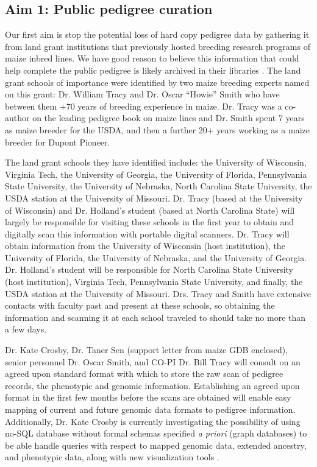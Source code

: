 \documentclass[draft,12pt]{article}
\begin{document}
\subsection*{Aim 1: Public pedigree curation}
Our first aim is  stop the potential loss of hard copy pedigree data by gathering it from land grant institutions that previously hosted breeding research programs of maize inbred lines. 
We have good reason to believe this information that could help complete the public pedigree is likely archived in their libraries . 
The land grant schools of importance were identified by two maize breeding experts named on this grant: Dr. William Tracy and Dr. Oscar ``Howie'' Smith who have between them +70 years of breeding experience in maize. 
Dr. Tracy was a co-author on the leading pedigree book on maize lines \cite{gerdes1993compilation} and Dr. Smith spent 7 years as maize breeder for the USDA, and then a further 20+ years working as a maize breeder for Dupont Pioneer.

The land grant schools they have identified include: the University of Wisconsin, Virginia Tech, the University of Georgia, the University of Florida, Pennsylvania State University, the University of Nebraska, North Carolina State University, the USDA station at the University of Missouri. 
Dr. Tracy (based at the University of Wisconsin) and Dr. Holland's student (based at North Carolina State) will largely be responsible for visiting these schools in the first year to obtain and digitally scan this information with portable digital scanners. 
Dr. Tracy will obtain information from the University of Wisconsin (host institution), the University of Florida, the University of Nebraska, and the University of Georgia. Dr. Holland's student will be responsible for North Carolina State University (host institution), Virginia Tech, Pennsylvania State University, and finally, the USDA station at the University of Missouri.
Drs. Tracy and Smith have extensive contacts with faculty past and present at these schools, so obtaining the information and scanning it at each school traveled to should take no more than a few days. 

Dr. Kate Crosby, Dr. Taner Sen (support letter from maize GDB enclosed), senior personnel Dr. Oscar Smith, and CO-PI Dr. Bill Tracy will consult on an agreed upon standard format with which to store the raw scan of pedigree records, the phenotypic and genomic information. 
Establishing an agreed upon format in the first few months before the scans are obtained will enable easy mapping of current and future genomic data formats to pedigree information.
Additionally, Dr. Kate Crosby is currently investigating the possibility of using no-SQL database without formal schemas specified \textit{a priori} (graph databases) to be able handle queries with respect to mapped genomic data, extended ancestry, and phenotypic data, along with new visualization tools \citep{ParejaTobes:2015bf}.
\end{document}
